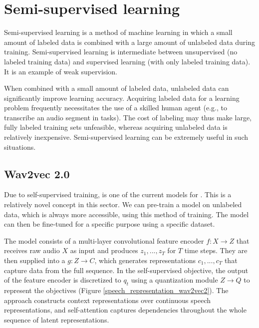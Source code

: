 \section{Semi-supervised learning}

Semi-supervised learning is a method of machine learning in which a small amount of labeled data is combined with a large amount of unlabeled data during training. 
Semi-supervised learning is intermediate between unsupervised (no labeled training data) and supervised learning (with only labeled training data). 
It is an example of weak supervision.

When combined with a small amount of labeled data, unlabeled data can significantly improve learning accuracy. 
Acquiring labeled data for a learning problem frequently necessitates the use of a skilled human agent (e.g., to transcribe an audio segment in  tasks).
The cost of labeling may thus make large, fully labeled training sets unfeasible, whereas acquiring unlabeled data is relatively inexpensive. Semi-supervised learning can be extremely useful in such situations.


\subsection{Wav2vec 2.0}

Due to self-supervised training,  is one of the current  models for . 
This is a relatively novel concept in this sector. We can pre-train a model on unlabeled data, which is always more accessible, using this method of training. 
The model can then be fine-tuned for a specific purpose using a specific dataset.

The model consists of a multi-layer convolutional feature encoder $f: X \rightarrow Z$ that receives raw audio $X$ as input and produces  ${z}_1,..., {z}_T$ for $T$ time steps. 
They are then supplied into a  $g: Z \rightarrow C$, which generates representations ${c}_1,..., {c}_T$ that capture data from the full sequence. 
In the self-supervised objective, the output of the feature encoder is discretized to $q_t$ using a quantization module $Z \rightarrow Q$ to represent the objectives (Figure \ref{speech_representation_wav2vec2}). 
The approach constructs context representations over continuous speech representations, and self-attention captures dependencies throughout the whole sequence of latent representations.

